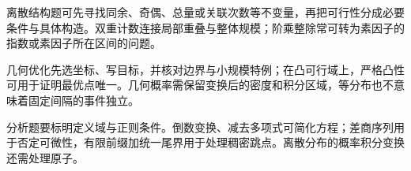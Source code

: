 离散结构题可先寻找同余、奇偶、总量或关联次数等不变量，再把可行性分成必要条件与具体构造。双重计数连接局部重叠与整体规模；阶乘整除常可转为素因子的指数或素因子所在区间的问题。

几何优化先选坐标、写目标，并核对边界与小规模特例；在凸可行域上，严格凸性可用于证明最优点唯一。几何概率需保留变换后的密度和积分区域，等分布也不意味着固定间隔的事件独立。

分析题要标明定义域与正则条件。倒数变换、减去多项式可简化方程；差商序列用于否定可微性，有限前缀加统一尾界用于处理稠密跳点。离散分布的概率积分变换还需处理原子。
\par\smallskip
